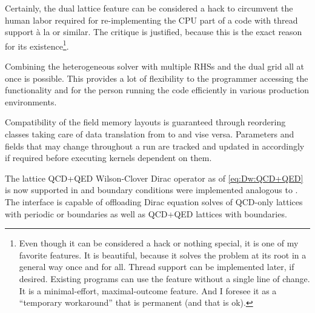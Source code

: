 Certainly, the dual lattice feature can be considered a hack to circumvent the human labor required for re-implementing the CPU part of a code with thread support à la \openmp or similar.
The critique is justified, because this is the exact reason for its existence\footnote{
Even though it can be considered a hack or nothing special, it is one of my favorite features.
It is beautiful, because it solves the problem at its root in a general way once and for all.
Thread support can be implemented later, if desired.
Existing programs can use the feature without a single line of change.
It is a minimal-effort, maximal-outcome feature.
And I foresee it as a ``temporary workaround'' that is permanent (and that is ok).
}.

Combining the heterogeneous solver with multiple RHSs and the dual grid all at once is possible.
This provides a lot of flexibility to the programmer accessing the functionality and for the person running the code efficiently in various production environments.

Compatibility of the field memory layouts is guaranteed through reordering classes taking care of data translation from \openqxd to \quda and vise versa.
Parameters and fields that may change throughout a run are tracked and updated in \quda accordingly if required before executing kernels dependent on them.

The lattice QCD+QED Wilson-Clover Dirac operator as of \cref{eq:Dw:QCD+QED} is now supported in \quda and \Cstar boundary conditions were implemented analogous to \openqxd.
The interface is capable of offloading Dirac equation solves of QCD-only lattices with periodic or \Cstar boundaries as well as QCD+QED lattices with \Cstar boundaries.







